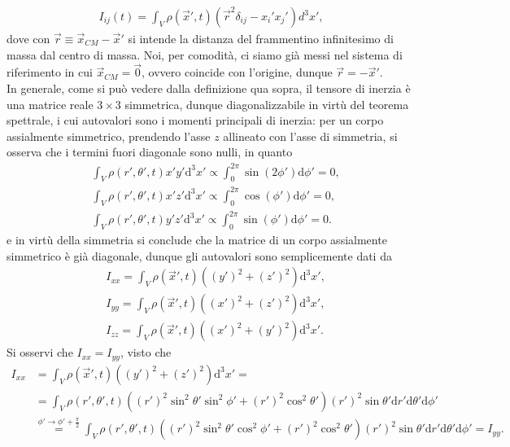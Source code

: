 \begin{align}
	I_{ij}(t) = \int_V \rho(\vec{x}', t)(\vec{r}^2 \delta_{ij} - x_i'x_j') d^3 x', 
\end{align}
dove con $\vec{r} \equiv \vec{x}_{CM} - \vec{x}'$ si intende la distanza del frammentino infinitesimo di massa dal centro di massa. Noi, per comodità, ci siamo già messi nel sistema di riferimento in cui $\vec{x}_{CM} = \vec{0}$, ovvero coincide con l'origine, dunque $\vec{r} = -\vec{x}'$. \\
In generale, come si può vedere dalla definizione qua sopra, il tensore di inerzia è una matrice reale $3 \times 3$ simmetrica, dunque diagonalizzabile in virtù del teorema spettrale, i cui autovalori sono i momenti principali di inerzia: per un corpo assialmente simmetrico, prendendo l'asse $z$ allineato con l'asse di simmetria, si osserva che i termini fuori diagonale sono nulli, in quanto
\begin{align}
	&\int_V \rho(r', \theta', t) x'y' \mathrm{d}^3 x' \propto \int_0^{2\pi} \sin{(2 \phi')} \mathrm{d}\phi' = 0, \nonumber \\
	&\int_V \rho(r', \theta', t) x'z' \mathrm{d}^3 x' \propto \int_0^{2 \pi} \cos{(\phi')} \mathrm{d}\phi' = 0, \\
	&\int_V \rho(r', \theta', t) y'z' \mathrm{d}^3 x' \propto \int_0^{2 \pi} \sin{(\phi')} \mathrm{d}\phi' = 0. \nonumber
\end{align}
e in virtù della simmetria si conclude che la matrice di un corpo assialmente simmetrico è già diagonale, dunque gli autovalori sono semplicemente dati da
\begin{align}
	&I_{xx} = \int_V \rho(\vec{x}',t)((y')^2 + (z')^2) \mathrm{d}^3 x', \nonumber \\
	&I_{yy} = \int_V \rho(\vec{x}', t)((x')^2 + (z')^2) \mathrm{d}^3 x', \\
	&I_{zz} = \int_V \rho(\vec{x}', t)((x')^2 + (y')^2) \mathrm{d}^3 x'. \nonumber
\end{align}
Si osservi che $I_{xx} = I_{yy}$, visto che
\begin{align}
	I_{xx} &= \int_V \rho(\vec{x}', t)((y')^2 + (z')^2) \mathrm{d}^3 x' = \nonumber \\
	&= \int_V \rho(r', \theta', t)((r')^2 \sin^2{\theta'} \sin^2{\phi'} + (r')^2 \cos^2{\theta'}) (r')^2 \sin{\theta'} \mathrm{d}r' \mathrm{d} \theta' \mathrm{d} \phi' \nonumber \\
	& \stackrel{\phi' \to \phi'+\frac{\pi}{2}}{=} \int_V \rho(r', \theta', t)((r')^2 \sin^2{\theta'} \cos^2{\phi'} + (r')^2 \cos^2{\theta'}) (r')^2 \sin{\theta'} \mathrm{d}r' \mathrm{d}\theta' \mathrm{d}\phi' = I_{yy}.
\end{align}
